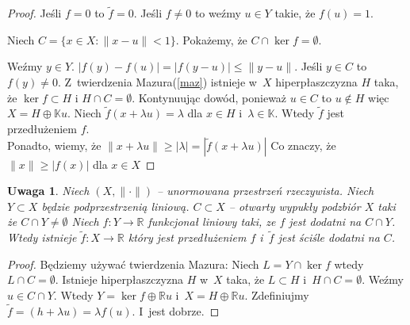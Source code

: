 \documentclass[10pt]{article}
\renewcommand{\[}{\begin{equation}}
\renewcommand{\]}{\end{equation}}
\newcommand{\R}{{\ensuremath{\mathbb R}}}
\newcommand{\K}{\ensuremath{\mathbb{K}}}
\newcommand{\norm}{\|\cdot\|}
\newtheorem{uw}[subsubsection]{Uwaga}
\begin{document}
\begin{proof}
  Jeśli $f=0$ to $\tilde{f} = 0$. Jeśli $f\not =0$ to weźmy $u \in Y$  takie, że $f(u)=1$.\par
	Niech $C =\{ x \in X: \|x - u\|<1\}$. Pokażemy, że $C\cap \ker f = \emptyset$.\par
	Weźmy $y\in Y$.
	$|f(y)-f(u)|=|f(y-u)|\le \|y - u\|$. Jeśli $y\in C$ to  $f(y) \not =0$.
	Z~{twierdzenia Mazura(\ref{maz})} istnieje w~$X$ hiperpłaszczyzna $H$ taka, że $\ker f\subset H$ i $H\cap C = \emptyset$.
	Kontynuując dowód, ponieważ $u\in C$ to $u \not \in H$ więc $X=H\oplus \K u$.
	Niech $\tilde{f}(x+\lambda u) = \lambda$ dla $x\in H$ i~$\lambda \in \K$. Wtedy $\tilde{f}$ jest  przedłużeniem $f$.\\
	Ponadto, wiemy, że $\|x +\lambda u\|\ge |\lambda| = |\tilde{f} (x+\lambda u)|$ Co znaczy, że $\|x\| \ge |f(x)|$ dla $x\in X$
\end{proof}
\begin{uw}
	Niech $(X,\norm)$ -- unormowana przestrzeń rzeczywista. Niech $Y\subset X$ będzie podprzestrzenią liniową.
	$C\subset X$ -- otwarty wypukły podzbiór $X$ taki że $C \cap Y \not = \emptyset $ Niech $f:Y\to \R$ funkcjonał liniowy taki, ze  
	$f$ jest dodatni na $C\cap Y$. Wtedy istnieje $\tilde{f} : X \to \R$ który jest przedłużeniem $f$ i~$\tilde{f}$ jest ściśle dodatni na $C$.
\end{uw}
\begin{proof}
	Będziemy używać twierdzenia Mazura: Niech $L= Y \cap \ker f$ wtedy $L\cap C = \emptyset$. 
	Istnieje hiperpłaszczyzna $H$ w~$X$ taka, że $L\subset H$ i~$H\cap C = \emptyset$.
	Weźmy $u \in C \cap Y$. Wtedy $Y = \ker f \oplus \R u$ i~$X = H\oplus \R u$.
	Zdefiniujmy $\tilde{f} = (h+\lambda u) = \lambda f(u)$. I~jest dobrze. 
\end{proof}
\end{document}
